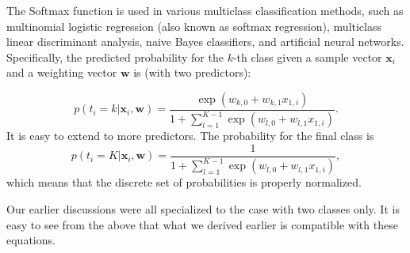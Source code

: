 \documentclass[%
oneside,                 %
final,                   %
10pt]{article}
\begin{document}
The Softmax function is used in various multiclass classification
methods, such as multinomial logistic regression (also known as
softmax regression), multiclass linear discriminant analysis, naive
Bayes classifiers, and artificial neural networks.  Specifically, the predicted probability for the $k$-th class given a sample
vector $\boldsymbol{x}_i$ and a weighting vector $\boldsymbol{w}$ is (with two
predictors):

\[
p(t_i=k\vert \boldsymbol{x}_i,  \boldsymbol{w} ) = \frac{\exp{(w_{k,0}+w_{k,1}x_{1,i})}} {1+\sum_{l=1}^{K-1}\exp{(w_{l,0}+w_{l,1}x_{1,i})}}.
\]
It is easy to extend to more predictors. The probability for the final class is 
\[
p(t_i=K\vert \boldsymbol{x}_i,  \boldsymbol{w} ) = \frac{1} {1+\sum_{l=1}^{K-1}\exp{(w_{l,0}+w_{l,1}x_{1,i})}},
\]
which means that the discrete set of probabilities is properly normalized. 

Our earlier discussions were all specialized to
the case with two classes only. It is easy to see from the above that
what we derived earlier is compatible with these equations.


\end{document}
